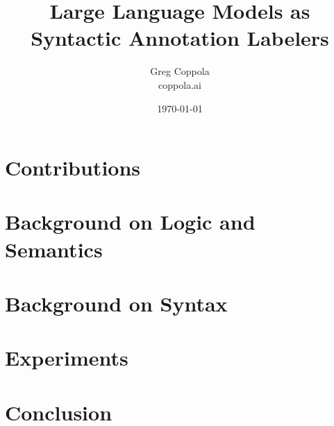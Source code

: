 \documentclass[11pt]{article}
\title{Large Language Models as Syntactic Annotation Labelers}
\author{Greg Coppola\\coppola.ai}
\date{\today}
\begin{document}
\maketitle



\section{Contributions}


\section{Background on Logic and Semantics}


\section{Background on Syntax}


\section{Experiments}


\section{Conclusion}




\end{document}
